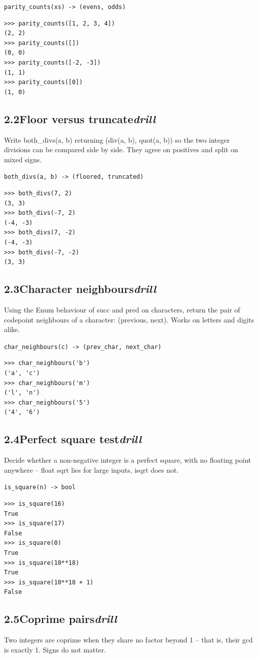 \documentclass[10pt,letterpaper]{book}
\begin{document}
\noindent\texttt{parity\_counts(xs) -> (evens, odds)}
\begin{lstlisting}[style=ex]
>>> parity_counts([1, 2, 3, 4])
(2, 2)
>>> parity_counts([])
(0, 0)
>>> parity_counts([-2, -3])
(1, 1)
>>> parity_counts([0])
(1, 0)
\end{lstlisting}
\subsection*{2.2\quad Floor versus truncate\hfill\textnormal{\textit{drill}}}
Write both\_divs(a, b) returning (div(a, b), quot(a, b)) so the two integer divisions can be compared side by side. They agree on positives and split on mixed signs.

\noindent\texttt{both\_divs(a, b) -> (floored, truncated)}
\begin{lstlisting}[style=ex]
>>> both_divs(7, 2)
(3, 3)
>>> both_divs(-7, 2)
(-4, -3)
>>> both_divs(7, -2)
(-4, -3)
>>> both_divs(-7, -2)
(3, 3)
\end{lstlisting}
\subsection*{2.3\quad Character neighbours\hfill\textnormal{\textit{drill}}}
Using the Enum behaviour of succ and pred on characters, return the pair of codepoint neighbours of a character: (previous, next). Works on letters and digits alike.

\noindent\texttt{char\_neighbours(c) -> (prev\_char, next\_char)}
\begin{lstlisting}[style=ex]
>>> char_neighbours('b')
('a', 'c')
>>> char_neighbours('m')
('l', 'n')
>>> char_neighbours('5')
('4', '6')
\end{lstlisting}
\subsection*{2.4\quad Perfect square test\hfill\textnormal{\textit{drill}}}
Decide whether a non-negative integer is a perfect square, with no floating point anywhere -- float sqrt lies for large inputs, isqrt does not.

\noindent\texttt{is\_square(n) -> bool}
\begin{lstlisting}[style=ex]
>>> is_square(16)
True
>>> is_square(17)
False
>>> is_square(0)
True
>>> is_square(10**18)
True
>>> is_square(10**18 + 1)
False
\end{lstlisting}
\subsection*{2.5\quad Coprime pairs\hfill\textnormal{\textit{drill}}}
Two integers are coprime when they share no factor beyond 1 -- that is, their gcd is exactly 1. Signs do not matter.
\end{document}
